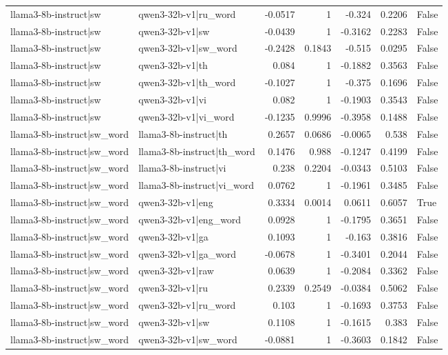 \begin{table}
\begin{tabular}{l l r r r r l}
llama3-8b-instruct|sw & qwen3-32b-v1|ru_word & -0.0517 & 1 & -0.324 & 0.2206 & False \\
llama3-8b-instruct|sw & qwen3-32b-v1|sw & -0.0439 & 1 & -0.3162 & 0.2283 & False \\
llama3-8b-instruct|sw & qwen3-32b-v1|sw_word & -0.2428 & 0.1843 & -0.515 & 0.0295 & False \\
llama3-8b-instruct|sw & qwen3-32b-v1|th & 0.084 & 1 & -0.1882 & 0.3563 & False \\
llama3-8b-instruct|sw & qwen3-32b-v1|th_word & -0.1027 & 1 & -0.375 & 0.1696 & False \\
llama3-8b-instruct|sw & qwen3-32b-v1|vi & 0.082 & 1 & -0.1903 & 0.3543 & False \\
llama3-8b-instruct|sw & qwen3-32b-v1|vi_word & -0.1235 & 0.9996 & -0.3958 & 0.1488 & False \\
llama3-8b-instruct|sw_word & llama3-8b-instruct|th & 0.2657 & 0.0686 & -0.0065 & 0.538 & False \\
llama3-8b-instruct|sw_word & llama3-8b-instruct|th_word & 0.1476 & 0.988 & -0.1247 & 0.4199 & False \\
llama3-8b-instruct|sw_word & llama3-8b-instruct|vi & 0.238 & 0.2204 & -0.0343 & 0.5103 & False \\
llama3-8b-instruct|sw_word & llama3-8b-instruct|vi_word & 0.0762 & 1 & -0.1961 & 0.3485 & False \\
llama3-8b-instruct|sw_word & qwen3-32b-v1|eng & 0.3334 & 0.0014 & 0.0611 & 0.6057 & True \\
llama3-8b-instruct|sw_word & qwen3-32b-v1|eng_word & 0.0928 & 1 & -0.1795 & 0.3651 & False \\
llama3-8b-instruct|sw_word & qwen3-32b-v1|ga & 0.1093 & 1 & -0.163 & 0.3816 & False \\
llama3-8b-instruct|sw_word & qwen3-32b-v1|ga_word & -0.0678 & 1 & -0.3401 & 0.2044 & False \\
llama3-8b-instruct|sw_word & qwen3-32b-v1|raw & 0.0639 & 1 & -0.2084 & 0.3362 & False \\
llama3-8b-instruct|sw_word & qwen3-32b-v1|ru & 0.2339 & 0.2549 & -0.0384 & 0.5062 & False \\
llama3-8b-instruct|sw_word & qwen3-32b-v1|ru_word & 0.103 & 1 & -0.1693 & 0.3753 & False \\
llama3-8b-instruct|sw_word & qwen3-32b-v1|sw & 0.1108 & 1 & -0.1615 & 0.383 & False \\
llama3-8b-instruct|sw_word & qwen3-32b-v1|sw_word & -0.0881 & 1 & -0.3603 & 0.1842 & False \\

\end{tabular}
\end{table}
